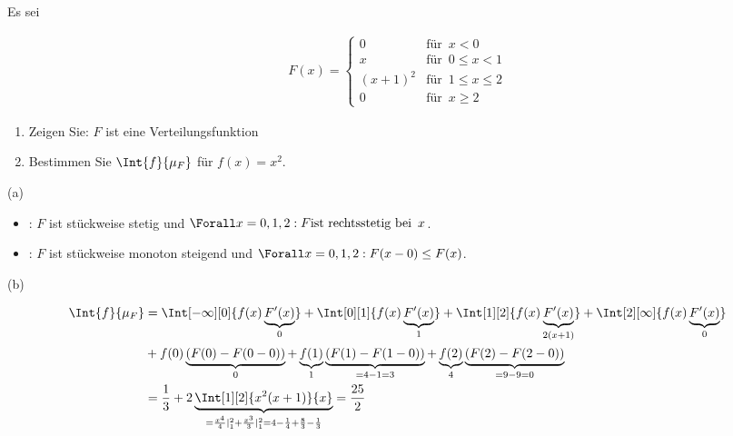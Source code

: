 
\begin{exercise}

Es sei

\begin{align*}
  F(x) =
  \begin{cases}
    0         & \text{für} \enspace x < 0 \\
    x         & \text{für} \enspace 0 \leq x < 1 \\
    (x + 1)^2 & \text{für} \enspace 1 \leq x \leq 2 \\
    0         & \text{für} \enspace x \geq 2
  \end{cases}
\end{align*}

\begin{enumerate}[label = (\alph*)]

  \item
  Zeigen Sie: $F$ ist eine Verteilungsfunktion
  
  \item
  Bestimmen Sie $\Int{f}{\mu_F}$ für $f(x) = x^2$.

\end{enumerate}

\end{exercise}


\begin{solution}

(a) \phantom{}

\begin{itemize}

  \item {}: $F$ ist stückweise stetig und $\Forall x = 0, 1, 2: F \text{ist rechtsstetig bei} \enspace x$.

  \item {}: $F$ ist stückweise monoton steigend und $\Forall x = 0, 1, 2: F(x - 0) \leq F(x)$.

\end{itemize}

(b)

\begin{align*}
  \Int{f}{\mu_F}
  & =
  \Int[-\infty][0]{f(x) \underbrace{F^\prime(x)}_0}
  +
  \Int[0][1]{f(x) \underbrace{F^\prime(x)}_1}
  +
  \Int[1][2]{f(x) \underbrace{F^\prime(x)}_{2 (x+1)}}
  +
  \Int[2][\infty]{f(x) \underbrace{F^\prime(x)}_0} \\
  & +
  f(0) \underbrace{(F(0) - F(0 - 0))}_0
  +
  \underbrace{f(1)}_1 \underbrace{(F(1) - F(1 - 0))}_{= 4-1 = 3}
  +
  \underbrace{f(2)}_4 \underbrace{(F(2) - F(2 - 0))}_{= 9-9 = 0} \\
  & =
  \frac{1}{3}
  +
  2 \underbrace
  {
    \Int[1][2]{x^2 (x + 1)}{x}
  }_{
    = \frac{x^4}{4} |_1^2 + \frac{x^3}{3} |_1^2
    = 4 - \frac{1}{4} + \frac{8}{3} - \frac{1}{3}
  }
  =
  \frac{25}{2}
\end{align*}

\end{solution}

